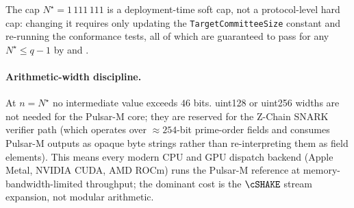The cap $N^\star = 1\,111\,111$ is a deployment-time soft cap, not
a protocol-level hard cap: changing it requires only updating the
\texttt{TargetCommitteeSize} constant and re-running the conformance
tests, all of which are guaranteed to pass for any
$N^\star \le q - 1$ by  and
.

\paragraph{Arithmetic-width discipline.}
At $n = N^\star$ no intermediate value exceeds $46$ bits. uint128 or
uint256 widths are not needed for the Pulsar-M core; they are
reserved for the Z-Chain SNARK verifier path (which operates over
$\approx 254$-bit prime-order fields and consumes Pulsar-M outputs
as opaque byte strings rather than re-interpreting them as field
elements). This means every modern CPU and GPU dispatch backend
(Apple Metal, NVIDIA CUDA, AMD ROCm) runs the Pulsar-M reference
at memory-bandwidth-limited throughput; the dominant cost is the
$\cSHAKE$ stream expansion, not modular arithmetic.
